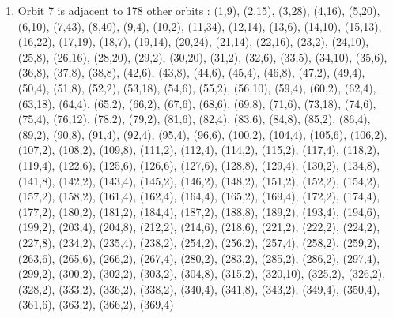 \documentclass[12pt]{article}
\begin{document}
\begin{enumerate}
\item Orbit 7 is adjacent to 178 other orbits : (1,9), (2,15), (3,28), (4,16), (5,20), (6,10), (7,43), (8,40), (9,4), (10,2), (11,34), (12,14), (13,6), (14,10), (15,13), (16,22), (17,19), (18,7), (19,14), (20,24), (21,14), (22,16), (23,2), (24,10), (25,8), (26,16), (28,20), (29,2), (30,20), (31,2), (32,6), (33,5), (34,10), (35,6), (36,8), (37,8), (38,8), (42,6), (43,8), (44,6), (45,4), (46,8), (47,2), (49,4), (50,4), (51,8), (52,2), (53,18), (54,6), (55,2), (56,10), (59,4), (60,2), (62,4), (63,18), (64,4), (65,2), (66,2), (67,6), (68,6), (69,8), (71,6), (73,18), (74,6), (75,4), (76,12), (78,2), (79,2), (81,6), (82,4), (83,6), (84,8), (85,2), (86,4), (89,2), (90,8), (91,4), (92,4), (95,4), (96,6), (100,2), (104,4), (105,6), (106,2), (107,2), (108,2), (109,8), (111,2), (112,4), (114,2), (115,2), (117,4), (118,2), (119,4), (122,6), (125,6), (126,6), (127,6), (128,8), (129,4), (130,2), (134,8), (141,8), (142,2), (143,4), (145,2), (146,2), (148,2), (151,2), (152,2), (154,2), (157,2), (158,2), (161,4), (162,4), (164,4), (165,2), (169,4), (172,2), (174,4), (177,2), (180,2), (181,2), (184,4), (187,2), (188,8), (189,2), (193,4), (194,6), (199,2), (203,4), (204,8), (212,2), (214,6), (218,6), (221,2), (222,2), (224,2), (227,8), (234,2), (235,4), (238,2), (254,2), (256,2), (257,4), (258,2), (259,2), (263,6), (265,6), (266,2), (267,4), (280,2), (283,2), (285,2), (286,2), (297,4), (299,2), (300,2), (302,2), (303,2), (304,8), (315,2), (320,10), (325,2), (326,2), (328,2), (333,2), (336,2), (338,2), (340,4), (341,8), (343,2), (349,4), (350,4), (361,6), (363,2), (366,2), (369,4)

\end{enumerate}
\end{document}
